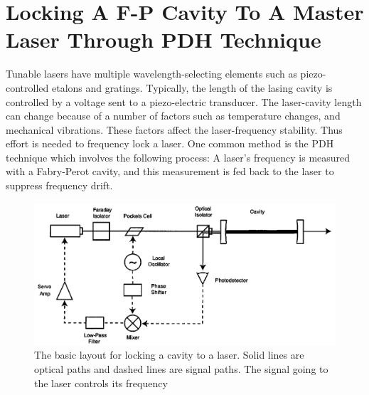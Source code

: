 \documentclass[12pt]{report}
\begin{document}
\chapter{Locking A F-P Cavity To A Master Laser Through PDH Technique}
Tunable lasers have multiple wavelength-selecting elements such as piezo-controlled etalons and gratings. Typically, the length of the lasing cavity is controlled by a voltage sent to a piezo-electric transducer. The laser-cavity length can change because of a number of factors such as temperature changes, and mechanical vibrations. These factors affect the laser-frequency stability. Thus effort is needed to frequency lock a laser. One common method is the PDH technique which involves the following process: A laser's frequency is measured with a Fabry-Perot cavity, and this measurement is fed back to the laser to suppress frequency drift\cite{PDH1983}\cite{PDHintro}.
\par
\begin{figure}[H]
    \centering
    \includegraphics[width=.8\textwidth]{PDHlayout.png}
    \caption{The basic layout for locking a cavity to a laser. Solid lines are optical paths and dashed lines are signal paths. The signal going to the laser controls its frequency \cite{PDHintro}}
    \label{fig:PDHlayout}
\end{figure}
\end{document}
